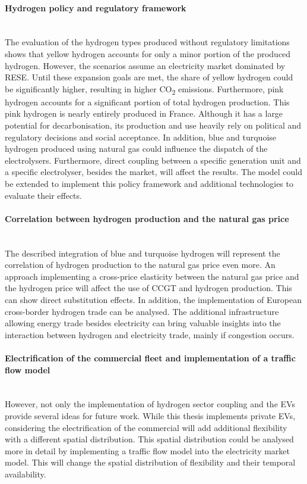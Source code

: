 \paragraph*{Hydrogen policy and regulatory framework}\mbox{}\\
The evaluation of the hydrogen types produced without regulatory limitations shows that yellow hydrogen accounts for only a minor portion of the produced hydrogen. However, the scenarios assume an electricity market dominated by \ac{RESE}. Until these expansion goals are met, the share of yellow hydrogen could be significantly higher, resulting in higher CO\textsubscript{2} emissions. Furthermore, pink hydrogen accounts for a significant portion of total hydrogen production. This pink hydrogen is nearly entirely produced in France. Although it has a large potential for decarbonisation, its production and use heavily rely on political and regulatory decisions and social acceptance. In addition, blue and turquoise hydrogen produced using natural gas could influence the dispatch of the electrolysers. Furthermore, direct coupling between a specific generation unit and a specific electrolyser, besides the market, will affect the results. The model could be extended to implement this policy framework and additional technologies to evaluate their effects. 


\paragraph*{Correlation between hydrogen production and the natural gas price}\mbox{}\\
The described integration of blue and turquoise hydrogen will represent the correlation of hydrogen production to the natural gas price even more. An approach implementing a cross-price elasticity between the natural gas price and the hydrogen price will affect the use of \ac{CCGT} and hydrogen production. This can show direct substitution effects. In addition, the implementation of European cross-border hydrogen trade can be analysed. The additional infrastructure allowing energy trade besides electricity can bring valuable insights into the interaction between hydrogen and electricity trade, mainly if congestion occurs.


\paragraph*{Electrification of the commercial fleet and implementation of a traffic flow model}\mbox{}\\
However, not only the implementation of hydrogen sector coupling and the \ac{EV}s provide several ideas for future work. While this thesis implements private \ac{EV}s, considering the electrification of the commercial will add additional flexibility with a different spatial distribution. This spatial distribution could be analysed more in detail by implementing a traffic flow model into the electricity market model. This will change the spatial distribution of flexibility and their temporal availability. 



